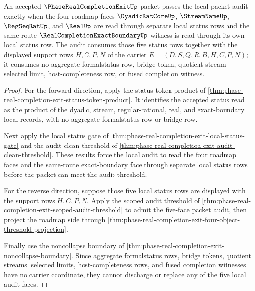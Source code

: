 \begin{theorem}
\label{thm:phase-real-completion-exit-five-face-local-audit}
An accepted $\PhaseRealCompletionExitUp$ packet passes the local packet audit exactly when the four roadmap faces $\DyadicRatCoreUp$, $\StreamNameUp$, $\RegSeqRatUp$, and $\RealUp$ are read through separate local status rows and the same-route $\RealCompletionExactBoundaryUp$ witness is read through its own local status row. The audit consumes those five status rows together with the displayed support rows $H,C,P,N$ of the carrier $E=(D,S,Q,R,B,H,C,P,N)$; it consumes no aggregate formalstatus row, bridge token, quotient stream, selected limit, host-completeness row, or fused completion witness.
\end{theorem}
\begin{proof}
For the forward direction, apply the status-token product of \autoref{thm:phase-real-completion-exit-status-token-product}. It identifies the accepted status read as the product of the dyadic, stream, regular-rational, real, and exact-boundary local records, with no aggregate formalstatus row or bridge row.

Next apply the local status gate of \autoref{thm:phase-real-completion-exit-local-status-gate} and the audit-clean threshold of \autoref{thm:phase-real-completion-exit-audit-clean-threshold}. These results force the local audit to read the four roadmap faces and the same-route exact-boundary face through separate local status rows before the packet can meet the audit threshold.

For the reverse direction, suppose those five local status rows are displayed with the support rows $H,C,P,N$. Apply the scoped audit threshold of \autoref{thm:phase-real-completion-exit-scoped-audit-threshold} to admit the five-face packet audit, then project the roadmap side through \autoref{thm:phase-real-completion-exit-four-object-threshold-projection}.

Finally use the noncollapse boundary of \autoref{thm:phase-real-completion-exit-noncollapse-boundary}. Since aggregate formalstatus rows, bridge tokens, quotient streams, selected limits, host-completeness rows, and fused completion witnesses have no carrier coordinate, they cannot discharge or replace any of the five local audit faces.
\end{proof}


